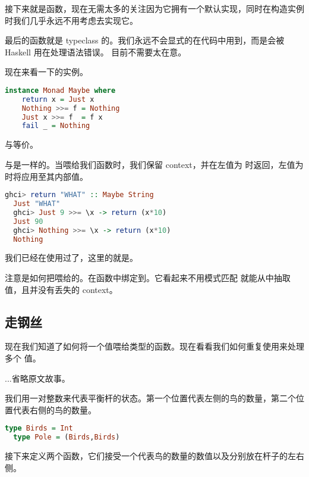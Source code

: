 \documentclass[./main.tex]{subfiles}
\begin{document}
接下来就是函数\acode{>>}，现在无需太多的关注因为它拥有一个默认实现，同时在构造实例时我们几乎永远不用考虑去实现它。

最后的函数就是 typeclass 的。我们永远不会显式的在代码中用到，而是会被 Haskell 用在处理语法错误。
目前不需要太在意。

现在来看一下的实例。

\begin{lstlisting}[language=Haskell]
  instance Monad Maybe where
    return x = Just x
    Nothing >>= f = Nothing
    Just x >>= f  = f x
    fail _ = Nothing
\end{lstlisting}

与等价。

\acode{>>=}与是一样的。当喂给我们函数时，我们保留 context，并在左值为
时返回，左值为时将应用至其内部值。

\begin{lstlisting}[language=Haskell]
  ghci> return "WHAT" :: Maybe String
  Just "WHAT"
  ghci> Just 9 >>= \x -> return (x*10)
  Just 90
  ghci> Nothing >>= \x -> return (x*10)
  Nothing
\end{lstlisting}

我们已经在使用过了，这里的就是。

注意是如何把喂给的。在函数中绑定到。它看起来不用模式匹配
就能从中抽取值，且并没有丢失的 context。

\subsection*{走钢丝}

现在我们知道了如何将一个值喂给类型的函数。现在看看我们如何重复使用\acode{>>=}来处理多个
值。

...省略原文故事。

我们用一对整数来代表平衡杆的状态。第一个位置代表左侧的鸟的数量，第二个位置代表右侧的鸟的数量。

\begin{lstlisting}[language=Haskell]
  type Birds = Int
  type Pole = (Birds,Birds)
\end{lstlisting}

接下来定义两个函数，它们接受一个代表鸟的数量的数值以及分别放在杆子的左右侧。
\end{document}
